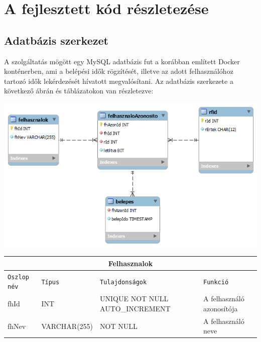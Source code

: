 \documentclass[11pt, a4paper]{article}
\begin{document}
	\section{A fejlesztett kód részletezése}
		\subsection{Adatbázis szerkezet}
			\begin{flushleft}
				A szolgáltatás mögött egy MySQL adatbázis fut a korábban említett Docker konténerben, ami a belépési idők rögzítését, illetve az adott felhasználóhoz tartozó idők lekérdezését hívatott megvalósítani. Az adatbázis szerkezete a következő ábrán és táblázatokon van részletezve: \\
			\end{flushleft}
			\begin{minipage}{\linewidth}
				\centering
				\includegraphics[width=0.9\linewidth]{../db/db_diagram}
				\label{fig:dbdiagram}
			\end{minipage}
			\vfill
				\begin{minipage}{\linewidth}
					\fontsize{10}{16}\selectfont
					\centering
					\begin{tabular}{||m{6em} m{6.5em} m{10em} m{12em}||}
						\hline
						\multicolumn{4}{|c|}{\textbf{Felhasznalok}} \\
						\hline
						\texttt{Oszlop név} & \texttt{Típus} & \texttt{Tulajdonságok} & \texttt{Funkció} \\ 
						\hline\hline
						fhId & INT & UNIQUE NOT NULL AUTO\_INCREMENT & A felhasználó azonosítója \\ 
						\hline
						fhNev & VARCHAR(255) & NOT NULL & A felhasználó neve \\
						\hline
					\end{tabular}
					\label{table:1}
				\end{minipage}
				\vfill
				
\end{document}
